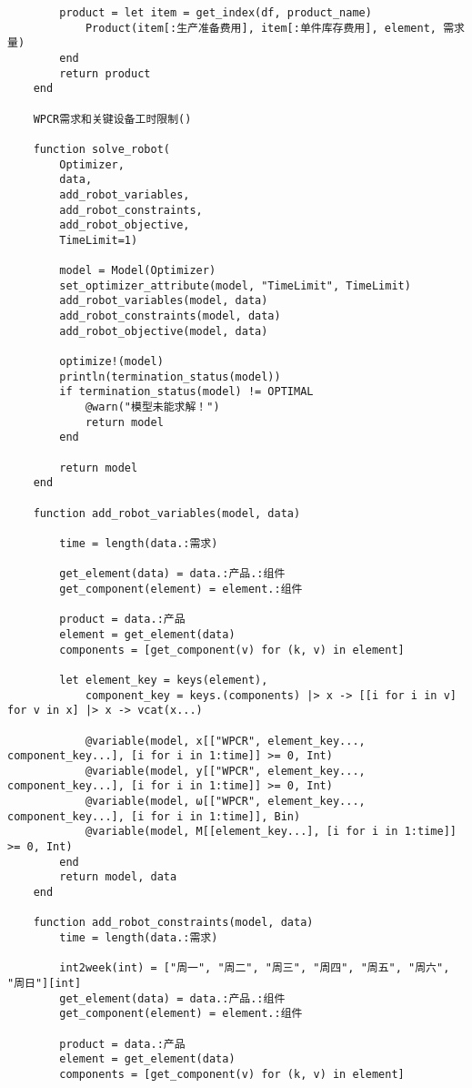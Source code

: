 \begin{appendices}
\begin{lstlisting}
        product = let item = get_index(df, product_name)
            Product(item[:生产准备费用], item[:单件库存费用], element, 需求量)
        end
        return product
    end

    WPCR需求和关键设备工时限制()

    function solve_robot(
        Optimizer,
        data,
        add_robot_variables,
        add_robot_constraints,
        add_robot_objective,
        TimeLimit=1)

        model = Model(Optimizer)
        set_optimizer_attribute(model, "TimeLimit", TimeLimit)
        add_robot_variables(model, data)
        add_robot_constraints(model, data)
        add_robot_objective(model, data)

        optimize!(model)
        println(termination_status(model))
        if termination_status(model) != OPTIMAL
            @warn("模型未能求解！")
            return model
        end

        return model
    end

    function add_robot_variables(model, data)

        time = length(data.:需求)

        get_element(data) = data.:产品.:组件
        get_component(element) = element.:组件

        product = data.:产品
        element = get_element(data)
        components = [get_component(v) for (k, v) in element]

        let element_key = keys(element),
            component_key = keys.(components) |> x -> [[i for i in v] for v in x] |> x -> vcat(x...)

            @variable(model, x[["WPCR", element_key..., component_key...], [i for i in 1:time]] >= 0, Int)
            @variable(model, y[["WPCR", element_key..., component_key...], [i for i in 1:time]] >= 0, Int)
            @variable(model, ω[["WPCR", element_key..., component_key...], [i for i in 1:time]], Bin)
            @variable(model, M[[element_key...], [i for i in 1:time]] >= 0, Int)
        end
        return model, data
    end

    function add_robot_constraints(model, data)
        time = length(data.:需求)

        int2week(int) = ["周一", "周二", "周三", "周四", "周五", "周六", "周日"][int]
        get_element(data) = data.:产品.:组件
        get_component(element) = element.:组件

        product = data.:产品
        element = get_element(data)
        components = [get_component(v) for (k, v) in element]


\end{lstlisting}
\end{appendices}
